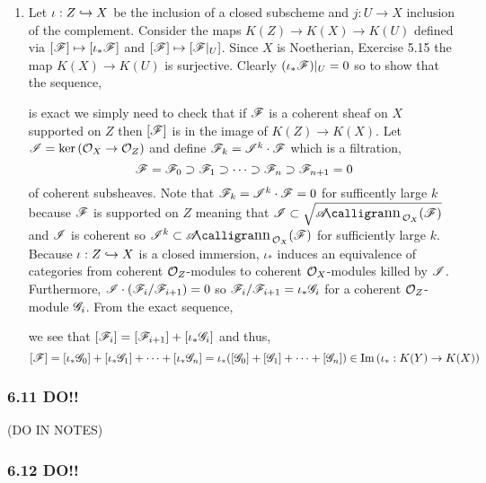 \documentclass[12pt]{article}
\begin{document}
\begin{enumerate}
\item Let $\iota : Z \hookrightarrow X$ be the inclusion of a closed subscheme and $j : U \to X$ inclusion of the complement. Consider the maps $K(Z) \to K(X) \to K(U)$ defined via $[\mathscr{F}] \mapsto [\iota_* \mathscr{F}]$ and $[\mathscr{F}] \mapsto [\mathscr{F}|_U]$. Since $X$ is Noetherian, Exercise 5.15 the map $K(X) \to K(U)$ is surjective. Clearly $(\iota_* \mathscr{F})|_U = 0$ so to show that the sequence,
\begin{center}
\end{center}
is exact we simply need to check that if $\mathscr{F}$ is a coherent sheaf on $X$ supported on $Z$ then $[\mathscr{F}]$ is in the image of $K(Z) \to K(X)$. Let $\mathscr{I} = \ker{(\mathcal{O}_{X} \to \mathcal{O}_{Z})}$ and define $\mathscr{F}_k = \mathscr{I}^k \cdot \mathscr{F}$ which is a filtration,
\[ \mathscr{F} = \mathscr{F}_0 \supset \mathscr{F}_1 \supset \cdots \supset \mathscr{F}_n \supset \mathscr{F}_{n+1} = 0 \]
of coherent subsheaves. Note that $\mathscr{F}_k = \mathscr{I}^k \cdot \mathscr{F} = 0$ for sufficently large $k$ because $\mathscr{F}$ is supported on $Z$ meaning that $\I \subset \sqrt{\shAnn{\struct{X}}{\F}}$ and $\mathscr{I}$ is coherent so $\I^k \subset \shAnn{\struct{X}}{\F}$ for sufficiently large $k$.
\bigskip\\
Because $\iota : Z \hookrightarrow X$ is a closed immersion, $\iota_*$ induces an equivalence of categories from coherent $\mathcal{O}_{Z}$-modules to coherent $\mathcal{O}_{X}$-modules killed by $\mathscr{I}$. Furthermore, $\mathscr{I} \cdot (\mathscr{F}_i/\mathscr{F}_{i+1}) = 0$ so $\mathscr{F}_i / \mathscr{F}_{i + 1} = \iota_* \mathscr{G}_i$ for a coherent $\mathcal{O}_{Z}$-module $\mathscr{G}_i$. From the exact sequence,
\begin{center}
\end{center}
we see that $[\mathscr{F}_i] = [\mathscr{F}_{i+1}] + [\iota_* \mathscr{G}_i]$ and thus,
\[ [\mathscr{F}] = [\iota_* \mathscr{G}_0] + [\iota_* \mathscr{G}_1] + \cdots + [\iota_* \mathscr{G}_n] = \iota_* ([\mathscr{G}_0] + [\mathscr{G}_1] + \cdots + [\mathscr{G}_n]) \in \mathrm{Im}\left( \iota_* : K(Y) \to K(X) \right) \]
\end{enumerate}

\subsubsection{6.11 DO!!}

(DO IN NOTES)

\subsubsection{6.12 DO!!}
\end{document}
